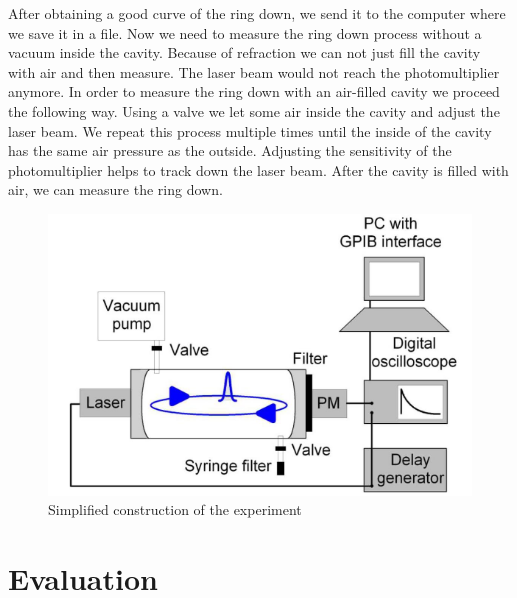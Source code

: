 \documentclass[10pt,a4paper]{article}
\begin{document}
After obtaining a good curve of the ring down, we send it to the computer where we save it in a file. Now we need to measure the ring down process without a vacuum inside the cavity. Because of refraction we can not just fill the cavity with air and then measure. The laser beam would not reach the photomultiplier anymore. In order to measure the ring down with an air-filled cavity we proceed the following way. Using a valve we let some air inside the cavity and adjust the laser beam. We repeat this process multiple times until the inside of the cavity has the same air pressure as the outside. Adjusting the sensitivity of the photomultiplier helps to track down the laser beam. After the cavity is filled with air, we can measure the ring down.

\begin{figure}[h]
	\includegraphics[scale = 0.7]{versuchsaufbau.png}
	\centering
	\caption{Simplified construction of the experiment}
	\label{aufbau}
\end{figure}

\newpage
\section{Evaluation}
\end{document}
